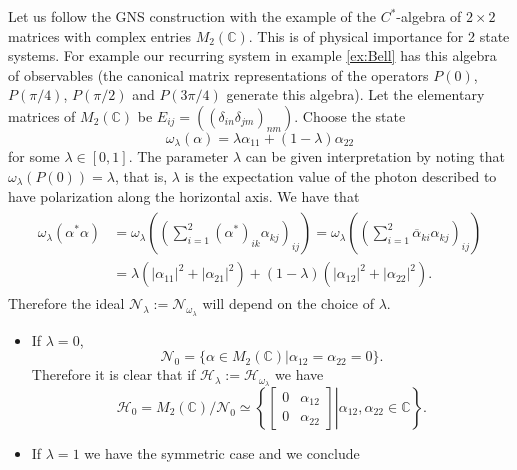 \begin{example}\label{example:M2}
Let us follow the GNS construction with the example of the $C^*$-algebra of $2\times 2$ matrices with complex entries $M_2(\mathbb{C})$. This is of physical importance for 2 state systems. For example our recurring system in example \ref{ex:Bell} has this algebra of observables (the canonical matrix representations of the operators $P(0)$, $P(\pi/4)$, $P(\pi/2)$ and $P(3\pi/4)$ generate this algebra). Let the elementary matrices of $M_2(\mathbb{C})$ be $E_{ij} = ((\delta_{in}\delta_{jm})_{nm})$. Choose the state
\begin{equation}
\omega_\lambda(\alpha) = \lambda \alpha_{11} + (1-\lambda)\alpha_{22}
\end{equation} 
for some $\lambda\in [0,1]$. The parameter $\lambda$ can be given interpretation by noting that $\omega_\lambda(P(0))=\lambda$, that is, $\lambda$ is the expectation value of the photon described to have polarization along the horizontal axis. We have that
\begin{align}
\begin{split}
\omega_\lambda (\alpha^*\alpha) & = \omega_\lambda\left(\left(\sum_{i=1}^2 (\alpha^*)_{ik}\alpha_{kj}\right)_{ij}\right) = \omega_\lambda\left(\left(\sum_{i=1}^2 \overline{\alpha}_{ki}\alpha_{kj}\right)_{ij}\right) \\
& = \lambda(|\alpha_{11}|^2+|\alpha_{21}|^2) + (1-\lambda)(|\alpha_{12}|^2+|\alpha_{22}|^2).
\end{split}
\end{align}
Therefore the ideal $\mathcal{N}_\lambda := \mathcal{N}_{\omega_\lambda}$ will depend on the choice of $\lambda$.
\begin{itemize}
\item If $\lambda = 0$, 
\begin{equation}
\mathcal{N}_0 = \{\alpha\in M_2(\mathbb{C})|\alpha_{12}=\alpha_{22}=0\}.
\end{equation}
Therefore it is clear that if $\mathcal{H}_\lambda:=\mathcal{H}_{\omega_\lambda}$ we have
\begin{equation}
\mathcal{H}_0=M_2(\mathbb{C})/\mathcal{N}_0\simeq\left\{\left.\begin{bmatrix}
0 & \alpha_{12} \\
0 & \alpha_{22}
\end{bmatrix}\right|\alpha_{12},\alpha_{22}\in\mathbb{C}\right\}.
\end{equation}
\item If $\lambda = 1 $ we have the symmetric case and we conclude

\end{itemize}
\end{example}
